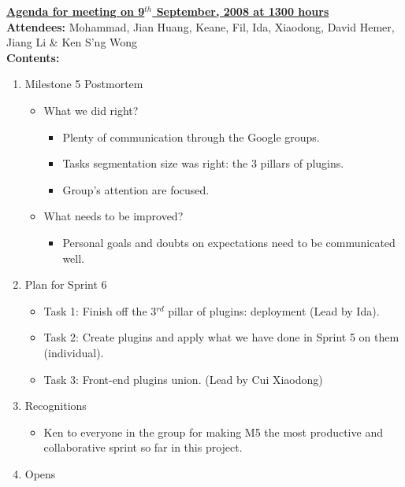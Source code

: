 \documentclass{letter}
\begin{document}
{\large \textbf{\underline{Agenda for meeting on 9$^{th}$ September, 2008 at 1300 hours}}}\\

\textbf{Attendees:} Mohammad, Jian Huang, Keane, Fil, Ida, Xiaodong, David Hemer, Jiang Li \& Ken S'ng Wong \\

\textbf{Contents:}

\begin{enumerate}
	\item Milestone 5 Postmortem
		\begin{itemize}
			\item What we did right?
				\begin{itemize}
					\item Plenty of communication through the Google groups.
					\item Tasks segmentation size was right: the 3 pillars of plugins.
					\item Group's attention are focused. 
				\end{itemize}
			\item What needs to be improved?
				\begin{itemize}
					\item Personal goals and doubts on expectations need to be communicated well.
				\end{itemize}
		\end{itemize}
	\item Plan for Sprint 6
		\begin{itemize}
			\item Task 1: Finish off the 3$^{rd}$ pillar of plugins: deployment (Lead by Ida).
			\item Task 2: Create plugins and apply what we have done in Sprint 5 on them (individual).
			\item Task 3: Front-end plugins union. (Lead by Cui Xiaodong) 
		\end{itemize}
	\item Recognitions
		\begin{itemize}
			\item Ken to everyone in the group for making M5 the most productive and collaborative sprint so far in this project.
		\end{itemize}
	\item Opens
\end{enumerate}
\end{document}
